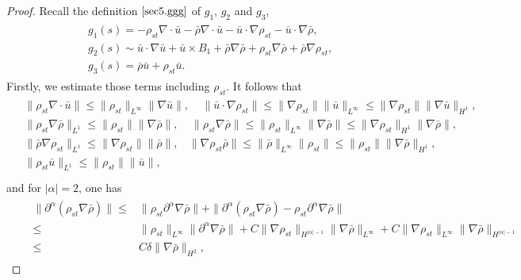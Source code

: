 \documentclass[11pt]{amsart}
\numberwithin{equation}{section}
\begin{document}
\begin{proof}
Recall the definition $\eqref{sec5.ggg}$ of $g_{1}$, $g_{2}$ and
$g_{3}$,
\begin{eqnarray*}
\begin{aligned}
& g_{1}(s)=-\rho_{st} \nabla \cdot \bar{u}-\bar{\rho} \nabla \cdot
\bar{u}-\bar{u} \cdot \nabla \rho_{st}-\bar{u} \cdot \nabla
\bar{\rho},\\
& g_{2}(s)\sim \bar{u} \cdot \nabla \bar{u} + \bar{u}\times B_{1} +\bar{\rho}\nabla \bar{\rho}+ \rho_{st}\nabla \bar{\rho} +\bar{\rho}\nabla \rho_{st},\\
& g_{3}(s)=\bar{\rho} \bar{u}+\rho_{st} \bar{u}.
\end{aligned}
\end{eqnarray*}
Firstly, we estimate those terms including $\rho_{st}$. It follows that
\begin{eqnarray*}
\begin{aligned}
&\|\rho_{st}\nabla \cdot \bar{u}\|\leq
\|\rho_{st}\|_{L^{\infty}}\|\nabla \bar{u}\|,\ \ \ \ \ \|\bar{u}
\cdot \nabla \rho_{st}\|\leq
\|\nabla\rho_{st}\|\|\bar{u}\|_{L^{\infty}}\leq
\|\nabla\rho_{st}\|\|\nabla\bar{u}\|_{H^{1}},\\
&\|\rho_{st}\nabla \bar{\rho}\|_{L^1}\leq \|\rho_{st}\|\|\nabla
\bar{\rho}\|,\ \ \ \ \ \|\rho_{st}\nabla \bar{\rho}\|\leq
\|\rho_{st}\|_{L^{\infty}}\|\nabla\bar{\rho}\|\leq
\|\nabla\rho_{st}\|_{H^{1}}\|\nabla\bar{\rho}\|,\\
 & \|\bar{\rho}
\nabla \rho_{st}\|_{L^1}\leq \|\nabla\rho_{st}\|\|\bar{\rho}\|,\ \ \
\ \|\nabla\rho_{st}\bar{\rho}\|\leq
\|\bar{\rho}\|_{L^{\infty}}\|\rho_{st}\|\leq
\|\rho_{st}\|\|\nabla\bar{\rho}\|_{H^{1}},\\
&\|\rho_{st} \bar{u}\|_{L^1} \leq \|\rho_{st}\|\|\bar{u}\|,\\
\end{aligned}
\end{eqnarray*}
and for $|\alpha|=2$, one has
\begin{eqnarray*}
&&\begin{aligned} \|\partial^{\alpha}(\rho_{st}\nabla
\bar{\rho})\|\leq  & \|\rho_{st}\partial^{\alpha}\nabla\bar{\rho}\|
+\|\partial^{\alpha}(\rho_{st}\nabla
\bar{\rho})-\rho_{st}\partial^{\alpha}\nabla\bar{\rho}\|\\[3mm]
\leq &
\|\rho_{st}\|_{L^{\infty}}\|\partial^{\alpha}\nabla\bar{\rho}\|
+C\|\nabla\rho_{st}\|_{H^{|\alpha|-1}}\|\nabla\bar{\rho}\|_{L^{\infty}}+C\|\nabla
\rho_{st}\|_{L^{\infty}}\|\nabla \bar{\rho}\|_{H^{|\alpha|-1}}\\[3mm]
\leq & C\delta\|\nabla \bar{\rho}\|_{H^{2}},

\end{aligned}
\end{eqnarray*}
\end{proof}
\end{document}
